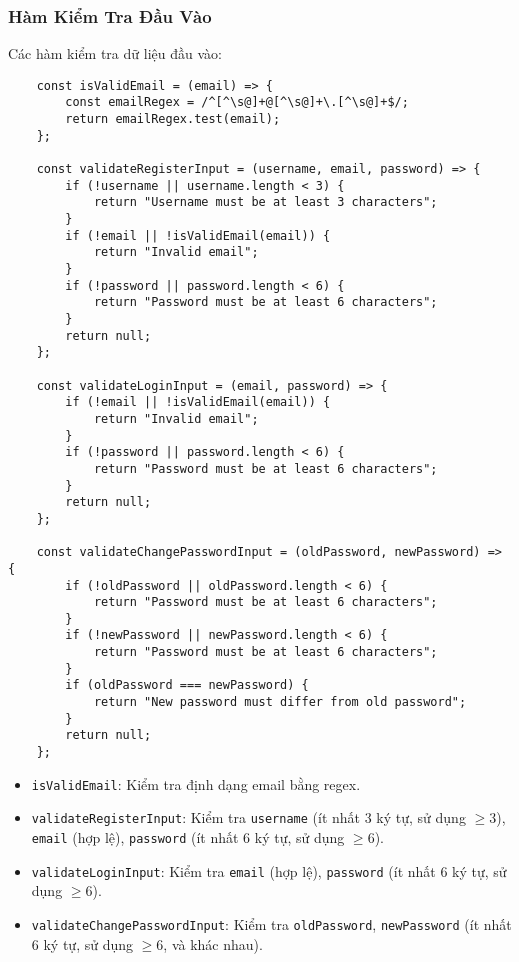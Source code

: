             \subsubsection{Hàm Kiểm Tra Đầu Vào}
                \hspace*{0.6cm}Các hàm kiểm tra dữ liệu đầu vào:
                \begin{lstlisting}
    const isValidEmail = (email) => {
        const emailRegex = /^[^\s@]+@[^\s@]+\.[^\s@]+$/;
        return emailRegex.test(email);
    };

    const validateRegisterInput = (username, email, password) => {
        if (!username || username.length < 3) {
            return "Username must be at least 3 characters";
        }
        if (!email || !isValidEmail(email)) {
            return "Invalid email";
        }
        if (!password || password.length < 6) {
            return "Password must be at least 6 characters";
        }
        return null;
    };

    const validateLoginInput = (email, password) => {
        if (!email || !isValidEmail(email)) {
            return "Invalid email";
        }
        if (!password || password.length < 6) {
            return "Password must be at least 6 characters";
        }
        return null;
    };

    const validateChangePasswordInput = (oldPassword, newPassword) => {
        if (!oldPassword || oldPassword.length < 6) {
            return "Password must be at least 6 characters";
        }
        if (!newPassword || newPassword.length < 6) {
            return "Password must be at least 6 characters";
        }
        if (oldPassword === newPassword) {
            return "New password must differ from old password";
        }
        return null;
    };
                \end{lstlisting}
                \begin{itemize}
                    \item \texttt{isValidEmail}: Kiểm tra định dạng email bằng regex.
                    \item \texttt{validateRegisterInput}: Kiểm tra \texttt{username} (ít nhất 3 ký tự, sử dụng $\geq 3$), \texttt{email} (hợp lệ), \texttt{password} (ít nhất 6 ký tự, sử dụng $\geq 6$).
                    \item \texttt{validateLoginInput}: Kiểm tra \texttt{email} (hợp lệ), \texttt{password} (ít nhất 6 ký tự, sử dụng $\geq 6$).
                    \item \texttt{validateChangePasswordInput}: Kiểm tra \texttt{oldPassword}, \texttt{newPassword} (ít nhất 6 ký tự, sử dụng $\geq 6$, và khác nhau).
                \end{itemize}

